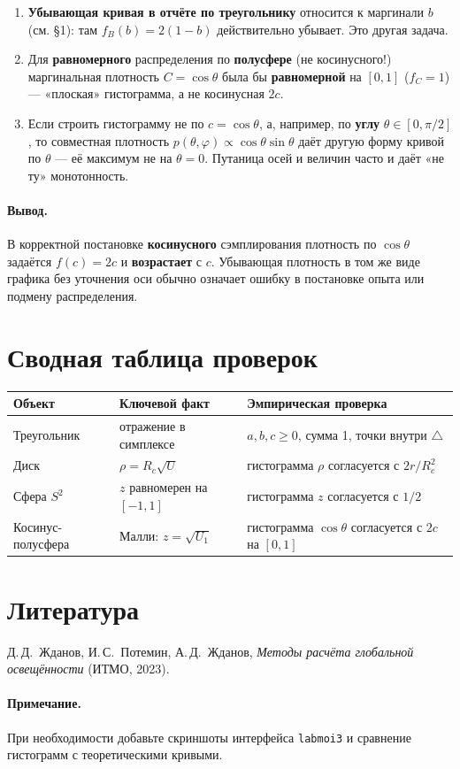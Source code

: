 \documentclass[12pt,a4paper]{article}
\begin{document}
\begin{enumerate}
  \item \textbf{Убывающая кривая в отчёте по треугольнику} относится к маргинали \textbf{$b$} (см. §1): там $f_B(b)=2(1-b)$ действительно убывает. Это другая задача.

  \item Для \textbf{равномерного} распределения по \textbf{полусфере} (не косинусного!) маргинальная плотность $C = \cos\theta$ была бы \textbf{равномерной} на $[0,1]$ ($f_C=1$) --- «плоская» гистограмма, а не косинусная $2c$.

  \item Если строить гистограмму не по $c=\cos\theta$, а, например, по \textbf{углу} $\theta \in [0,\pi/2]$, то совместная плотность $p(\theta,\varphi)\propto \cos\theta\sin\theta$ даёт другую форму кривой по $\theta$ --- её максимум не на $\theta=0$. Путаница осей и величин часто и даёт «не ту» монотонность.
\end{enumerate}

\paragraph{Вывод.}
В корректной постановке \textbf{косинусного} сэмплирования плотность по \textbf{$\cos\theta$} задаётся $f(c)=2c$ и \textbf{возрастает} с $c$. Убывающая плотность в том же виде графика без уточнения оси обычно означает ошибку в постановке опыта или подмену распределения.

\section{Сводная таблица проверок}

\begin{center}
\begin{tabular}{@{}lll@{}}
\toprule
Объект & Ключевой факт & Эмпирическая проверка \\
\midrule
Треугольник & отражение в симплексе & $a,b,c\ge 0$, сумма 1, точки внутри $\triangle$ \\
Диск & $\rho = R_c\sqrt{U}$ & гистограмма $\rho$ согласуется с $2r/R_c^2$ \\
Сфера $S^2$ & $z$ равномерен на $[-1,1]$ & гистограмма $z$ согласуется с $1/2$ \\
Косинус-полусфера & Малли: $z=\sqrt{U_1}$ & гистограмма $\cos\theta$ согласуется с $2c$ на $[0,1]$ \\
\bottomrule
\end{tabular}
\end{center}

\section*{Литература}
Д.\,Д.~Жданов, И.\,С.~Потемин, А.\,Д.~Жданов, \textit{Методы расчёта глобальной освещённости} (ИТМО, 2023).

\paragraph{Примечание.}
При необходимости добавьте скриншоты интерфейса \texttt{labmoi3} и сравнение гистограмм с теоретическими кривыми.
\end{document}
